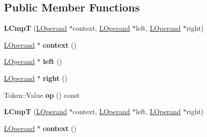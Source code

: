 \subsection*{Public Member Functions}
\begin{DoxyCompactItemize}
\item 
{\bfseries L\+CmpT} (\hyperlink{classv8_1_1internal_1_1_l_operand}{L\+Operand} $\ast$context, \hyperlink{classv8_1_1internal_1_1_l_operand}{L\+Operand} $\ast$left, \hyperlink{classv8_1_1internal_1_1_l_operand}{L\+Operand} $\ast$right)\hypertarget{classv8_1_1internal_1_1_l_cmp_t_af9639e776ae4b34555d2d8b124fd06a2}{}\label{classv8_1_1internal_1_1_l_cmp_t_af9639e776ae4b34555d2d8b124fd06a2}

\item 
\hyperlink{classv8_1_1internal_1_1_l_operand}{L\+Operand} $\ast$ {\bfseries context} ()\hypertarget{classv8_1_1internal_1_1_l_cmp_t_a0beea53d13e064416006b17596aae2a1}{}\label{classv8_1_1internal_1_1_l_cmp_t_a0beea53d13e064416006b17596aae2a1}

\item 
\hyperlink{classv8_1_1internal_1_1_l_operand}{L\+Operand} $\ast$ {\bfseries left} ()\hypertarget{classv8_1_1internal_1_1_l_cmp_t_a6468d4b481e8c5ea5d268ad8b9bb0770}{}\label{classv8_1_1internal_1_1_l_cmp_t_a6468d4b481e8c5ea5d268ad8b9bb0770}

\item 
\hyperlink{classv8_1_1internal_1_1_l_operand}{L\+Operand} $\ast$ {\bfseries right} ()\hypertarget{classv8_1_1internal_1_1_l_cmp_t_a13a757622a5ddbff0584adc3b84baa8d}{}\label{classv8_1_1internal_1_1_l_cmp_t_a13a757622a5ddbff0584adc3b84baa8d}

\item 
Token\+::\+Value {\bfseries op} () const \hypertarget{classv8_1_1internal_1_1_l_cmp_t_affeb8a538e036a9115089631b13671f8}{}\label{classv8_1_1internal_1_1_l_cmp_t_affeb8a538e036a9115089631b13671f8}

\item 
{\bfseries L\+CmpT} (\hyperlink{classv8_1_1internal_1_1_l_operand}{L\+Operand} $\ast$context, \hyperlink{classv8_1_1internal_1_1_l_operand}{L\+Operand} $\ast$left, \hyperlink{classv8_1_1internal_1_1_l_operand}{L\+Operand} $\ast$right)\hypertarget{classv8_1_1internal_1_1_l_cmp_t_af9639e776ae4b34555d2d8b124fd06a2}{}\label{classv8_1_1internal_1_1_l_cmp_t_af9639e776ae4b34555d2d8b124fd06a2}

\item 
\hyperlink{classv8_1_1internal_1_1_l_operand}{L\+Operand} $\ast$ {\bfseries context} ()\hypertarget{classv8_1_1internal_1_1_l_cmp_t_a0beea53d13e064416006b17596aae2a1}{}\label{classv8_1_1internal_1_1_l_cmp_t_a0beea53d13e064416006b17596aae2a1}


\end{DoxyCompactItemize}

